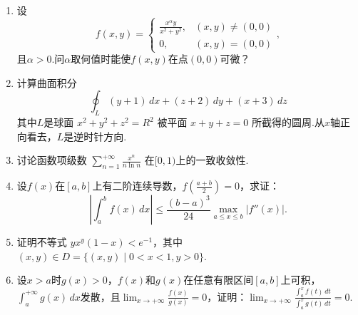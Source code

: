 \documentclass{article}
\begin{document}
\begin{enumerate}
\item
设
\[
f(x,y)=
\begin{cases}
\displaystyle\frac{x^\alpha y}{x^2+y^2},&(x,y)\ne(0,0)\\
0,&(x,y)=(0,0)
\end{cases},
\]
且$\alpha>0$.问$\alpha$取何值时能使$f(x,y)$在点$(0,0)$可微？
\item
计算曲面积分
\[
\oint_L(y+1)\,dx+(z+2)\,dy+(x+3)\,dz
\]
其中$L$是球面 $x^2+y^2+z^2=R^2$ 被平面 $x+y+z=0$ 所截得的圆周.从$x$轴正向看去，$L$是逆时针方向.
\item
讨论函数项级数 $\displaystyle \sum_{n=1}^{+\infty}\frac{x^n}{n\ln n}$ 在$[0,1)$上的一致收敛性.
\item
设$f(x)$在$[a,b]$上有二阶连续导数，$\displaystyle f\left(\frac{a+b}{2}\right)=0$，求证：
\[
\left|\int_{a}^{b}f(x)\,dx\right|\le\frac{(b-a)^3}{24}\max_{a\le x\le b}\left|f''(x)\right|.
\]
\item
证明不等式 $yx^y(1-x)<e^{-1}$，其中$(x,y)\in D=\{(x,y)\mid 0<x<1,y>0\}$.
\item
设$x>a$时$g(x)>0$，$f(x)$和$g(x)$在任意有限区间$[a,b]$上可积，$\displaystyle \int_{a}^{+\infty}g(x)\,dx$发散，且$\displaystyle \lim_{x\to+\infty}\frac{f(x)}{g(x)}=0$，证明：$\displaystyle \lim_{x\to+\infty}\frac{\displaystyle\int_a^xf(t)\,dt}{\displaystyle\int_a^xg(t)\,dt}=0$.
\end{enumerate}
\end{document}
